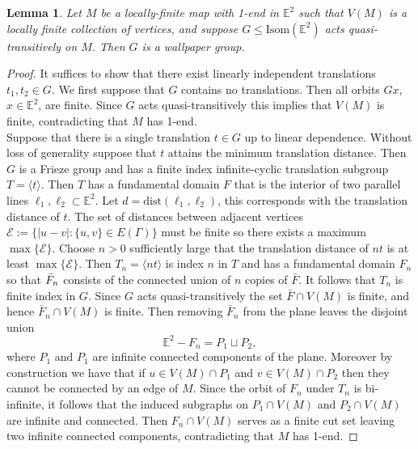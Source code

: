 \documentclass{article}
\numberwithin{equation}{section}
\newcommand{\EE}{\mathbb{E}}
\newtheorem{lemma}{Lemma}[section]
\theoremstyle{definition}
\theoremstyle{remark}
\begin{document}
\begin{lemma}\label{lem:wallpaper}
  Let $M$ be a locally-finite map with 1-end in $\EE^2$ such that $V(M)$ is a locally finite collection of vertices, and suppose $G\leq \text{Isom}(\EE^2)$ acts quasi-transitively on $M$. Then $G$ is a wallpaper group.
\end{lemma}
\begin{proof}
    It suffices to show that there exist linearly independent translations $t_1,t_2\in G$. We first suppose that $G$ contains no translations. Then all orbits $Gx$, $x\in\EE^2$, are finite. Since $G$ acts quasi-transitively this implies that $V(M)$ is finite, contradicting that $M$ has 1-end.\\
    Suppose that there is a single translation $t\in G$ up to linear dependence. Without loss of generality suppose that $t$ attains the minimum translation distance. Then $G$ is a Frieze group and has a finite index infinite-cyclic translation subgroup $T=\langle t\rangle$. Then $T$ has a fundamental domain $F$ that is the interior of two parallel lines $\ell_1,\ell_2\subset \EE^2$. Let $d=\text{dist}(\ell_1,\ell_2)$, this corresponds with the translation distance of $t$. 
    The set of distances between adjacent vertices $\mathcal{E}:=\{|u-v|:\{u,v\}\in E(\Gamma)\}$ must be finite so there exists a maximum $\max\{\mathcal{E}\}$.
    Choose $n>0$ sufficiently large that the translation distance of $nt$ is at least $\max\{\mathcal{E}\}$. Then $T_n=\langle nt\rangle$ is index $n$ in $T$ and has a fundamental domain $F_n$  so that $\Bar{F}_n$  consists of the connected union of $n$ copies of $\bar{F}$. It follows that $T_n$ is finite index in $G$. Since $G$ acts quasi-transitively the set $\bar{F}\cap V(M)$ is finite, and hence $\bar{F}_n\cap V(M)$ is finite. Then removing $\bar{F}_n$ from the plane leaves the disjoint union
     $$\EE^2-F_n=P_1\sqcup P_2,$$
    where $P_1$ and $P_1$ are infinite connected components of the plane. Moreover by construction we have that if $u\in V(M)\cap P_1$ and $v\in V(M)\cap P_2$ then they cannot be connected by an edge of $M$.
    Since the orbit of $F_n$ under $T_n$ is bi-infinite, it follows that the induced subgraphs on $P_1\cap V(M)$ and $P_2\cap V(M)$ are infinite and connected. Then $F_n\cap V(M)$ serves as a finite cut set leaving two infinite connected components, contradicting that $M$ has 1-end.
    \end{proof}
\end{document}
